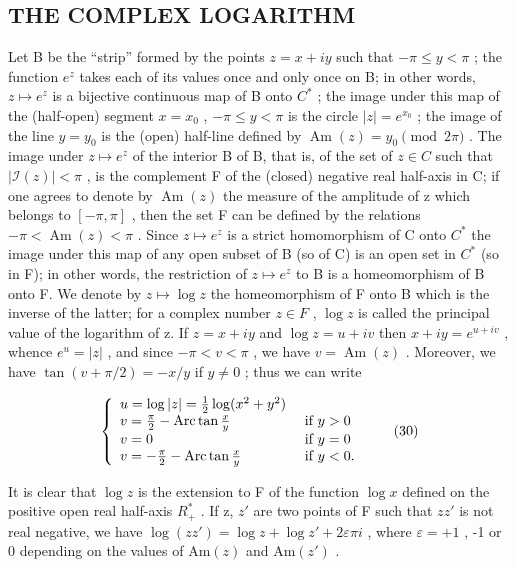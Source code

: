 \subsection{THE COMPLEX LOGARITHM}

Let B be the ``strip'' formed by the points \(z = x + iy\) such that \(-\pi \leqslant y < \pi\) ; the function \(e^{z}\) takes each of its values once and only once on B; in other words, \(z \mapsto e^{z}\) is a bijective continuous map of B onto \(C^{*}\) ; the image under this map of the (half-open) segment \(x = x_{0}\) , \(-\pi \leqslant y < \pi\) is the circle \(|z| = e^{x_{0}}\) ; the image of the line \(y = y_{0}\) is the (open) half-line defined by \(\operatorname{Am}(z) = y_{0} \pmod{2\pi}\) . The image under \(z \mapsto e^{z}\) of the interior B of B, that is, of the set of \(z \in C\) such that \(|\mathcal{I}(z)| < \pi\) , is the complement F of the (closed) negative real half-axis in C; if one agrees to denote by \(\operatorname{Am}(z)\) the measure of the amplitude of z which belongs to \([-\pi, \pi]\) , then the set F can be defined by the relations \(-\pi < \operatorname{Am}(z) < \pi\) . Since \(z \mapsto e^{z}\) is a strict homomorphism of C onto \(C^{*}\) the image under this map of any open subset of B (so of C) is an open set in \(C^{*}\) (so in F); in other words, the restriction of \(z \mapsto e^{z}\) to B is a homeomorphism of B onto F. We denote by \(z \mapsto \log z\) the homeomorphism of F onto B which is the inverse of the latter; for a complex number \(z \in F\) , \(\log z\) is called the principal value of the logarithm of z. If \(z = x + iy\) and \(\log z = u + iv\) then \(x + iy = e^{u + iv}\) , whence \(e^{u} = |z|\) , and since \(-\pi < v < \pi\) , we have \(v = \operatorname{Am}(z)\) . Moreover, we have \(\tan(v + \pi/2) = -x/y\) if \(y \neq 0\) ; thus we can write

\[
\left\{ \begin{array}{l l} u = \log | z | = \frac {1}{2} \log (x ^ {2} + y ^ {2}) \\ v = \frac {\pi}{2} - \operatorname{Arc} \tan \frac {x}{y} & \text { if } y > 0 \\ v = 0 & \text { if } y = 0 \\ v = - \frac {\pi}{2} - \operatorname{Arc} \tan \frac {x}{y} & \text { if } y <   0. \end{array} \right.\tag{30}
\]

It is clear that \(\log z\) is the extension to F of the function \(\log x\) defined on the positive open real half-axis \(R_{+}^{*}\) . If z, \(z'\) are two points of F such that \(zz'\) is not real negative, we have \(\log(zz') = \log z + \log z' + 2\varepsilon\pi i\) , where \(\varepsilon = +1\) , -1 or 0 depending on the values of \(\mathrm{Am}(z)\) and \(\mathrm{Am}(z')\) .

